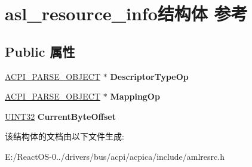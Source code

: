 \hypertarget{structasl__resource__info}{}\section{asl\+\_\+resource\+\_\+info结构体 参考}
\label{structasl__resource__info}
\subsection*{Public 属性}
\begin{DoxyCompactItemize}
\item 
\mbox{\label{structasl__resource__info_a3e0fc78f40b20029f6fc1cc1c5114ed5}} 
\hyperlink{unionacpi__parse__object}{A\+C\+P\+I\+\_\+\+P\+A\+R\+S\+E\+\_\+\+O\+B\+J\+E\+CT} $\ast$ {\bfseries Descriptor\+Type\+Op}
\item 
\mbox{\label{structasl__resource__info_ac5e21a29c27b6d2272dc72e1a88a92a6}} 
\hyperlink{unionacpi__parse__object}{A\+C\+P\+I\+\_\+\+P\+A\+R\+S\+E\+\_\+\+O\+B\+J\+E\+CT} $\ast$ {\bfseries Mapping\+Op}
\item 
\mbox{\label{structasl__resource__info_aa3eb91b5d25520156f98df39b47dcc10}} 
\hyperlink{_processor_bind_8h_ae1e6edbbc26d6fbc71a90190d0266018}{U\+I\+N\+T32} {\bfseries Current\+Byte\+Offset}
\end{DoxyCompactItemize}


该结构体的文档由以下文件生成\+:\begin{DoxyCompactItemize}
\item 
E\+:/\+React\+O\+S-\/0../drivers/bus/acpi/acpica/include/amlresrc.\+h\end{DoxyCompactItemize}
